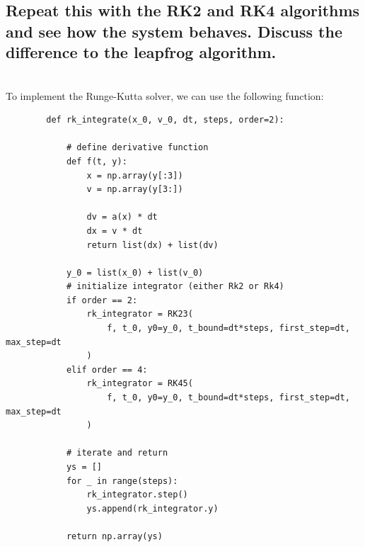 \newpage
\subsection{Repeat this with the RK2 and RK4 algorithms and see how the 
    system behaves. Discuss the difference to the leapfrog algorithm.
} \ \\
    To implement the Runge-Kutta solver, we can use the following function: \\
    \begin{lstlisting}
        def rk_integrate(x_0, v_0, dt, steps, order=2):
        
            # define derivative function
            def f(t, y):
                x = np.array(y[:3])
                v = np.array(y[3:])
        
                dv = a(x) * dt
                dx = v * dt
                return list(dx) + list(dv)
        
            y_0 = list(x_0) + list(v_0)
            # initialize integrator (either Rk2 or Rk4)
            if order == 2:
                rk_integrator = RK23(
                    f, t_0, y0=y_0, t_bound=dt*steps, first_step=dt, max_step=dt
                )
            elif order == 4:
                rk_integrator = RK45(
                    f, t_0, y0=y_0, t_bound=dt*steps, first_step=dt, max_step=dt
                )
        
            # iterate and return
            ys = []
            for _ in range(steps):
                rk_integrator.step()
                ys.append(rk_integrator.y)
        
            return np.array(ys)\end{lstlisting}
    \newpage

